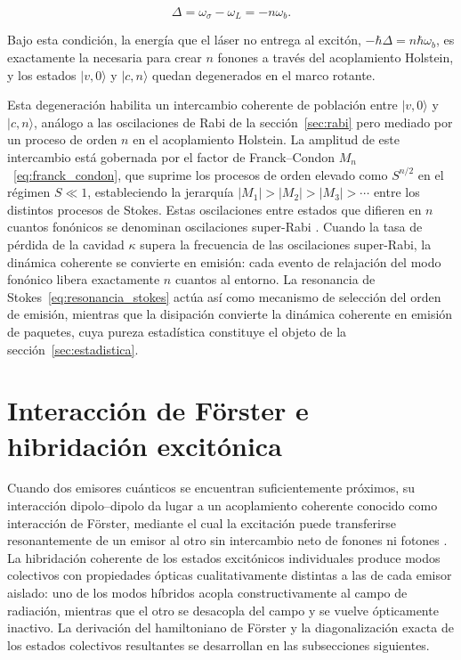 \begin{equation}
	\Delta = \omega_\sigma - \omega_ L= -n\omega_b.
	\label{eq:resonancia_stokes}
\end{equation}

Bajo esta condición, la energía que el láser no entrega al excitón, $-\hbar\Delta = n\hbar\omega_b$, es exactamente la necesaria para crear $n$ fonones a través del acoplamiento Holstein, y los estados $|v,0\rangle$ y $|c,n\rangle$ quedan degenerados en el marco rotante.

Esta degeneración habilita un intercambio coherente de población entre $|v,0\rangle$ y $|c,n\rangle$, análogo a las oscilaciones de Rabi de la sección~\ref{sec:rabi} pero mediado por un proceso de orden $n$ en el acoplamiento Holstein. La amplitud de este intercambio está gobernada por el factor de Franck--Condon $M_n$~\eqref{eq:franck_condon}, que suprime los procesos de orden elevado como $S^{n/2}$ en el régimen $S \ll 1$, estableciendo la jerarquía $|M_1| > |M_2| > |M_3| > \cdots$ entre los distintos procesos de Stokes. Estas oscilaciones entre estados que difieren en $n$ cuantos fonónicos se denominan oscilaciones super-Rabi \cite{strekalov2014}. Cuando la tasa de pérdida de la cavidad $\kappa$ supera la frecuencia de las oscilaciones super-Rabi, la dinámica coherente se convierte en emisión: cada evento de relajación del modo fonónico libera exactamente $n$ cuantos al entorno. La resonancia de Stokes~\eqref{eq:resonancia_stokes} actúa así como mecanismo de selección del orden de emisión, mientras que la disipación convierte la dinámica coherente en emisión de paquetes, cuya pureza estadística constituye el objeto de la sección~\ref{sec:estadistica}.


\section{Interacción de Förster e hibridación excitónica}
\label{sec:forster}

Cuando dos emisores cuánticos se encuentran suficientemente próximos, su interacción dipolo--dipolo da lugar a un acoplamiento coherente conocido como interacción de Förster, mediante el cual la excitación puede transferirse resonantemente de un emisor al otro sin intercambio neto de fonones ni fotones \cite{forster1948}. La hibridación coherente de los estados excitónicos individuales produce modos colectivos con propiedades ópticas cualitativamente distintas a las de cada emisor aislado: uno de los modos híbridos acopla constructivamente al campo de radiación, mientras que el otro se desacopla del campo y se vuelve ópticamente inactivo. La derivación del hamiltoniano de Förster y la diagonalización exacta de los estados colectivos resultantes se desarrollan en las subsecciones siguientes.

